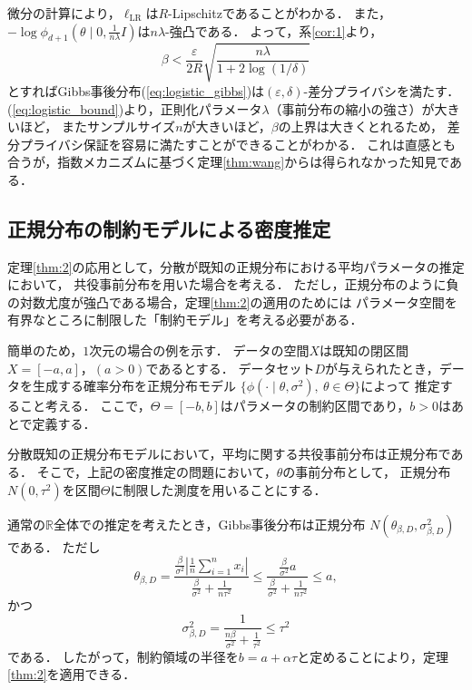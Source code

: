 \documentclass{jarticle}
\theoremstyle{definition}
\begin{document}
微分の計算により，$\ell_\mathrm{LR}$は$R$-Lipschitzであることがわかる．
また，$-\log \phi_{d+1}(\theta \mid 0, \frac{1}{n\lambda} I)$は$n\lambda$-強凸である．
よって，系\ref{cor:1}より，
\begin{equation}
\beta < \frac{\varepsilon}{2R}\sqrt{\frac{n\lambda}{1 + 2\log(1/\delta)}}
\label{eq:logistic_bound}
\end{equation}
とすればGibbs事後分布(\ref{eq:logistic_gibbs})は$(\varepsilon, \delta)$-差分プライバシを満たす．
(\ref{eq:logistic_bound})より，正則化パラメータ$\lambda$（事前分布の縮小の強さ）が大きいほど，
またサンプルサイズ$n$が大きいほど，$\beta$の上界は大きくとれるため，
差分プライバシ保証を容易に満たすことができることがわかる．
これは直感とも合うが，指数メカニズムに基づく定理\ref{thm:wang}からは得られなかった知見である．

\subsection{正規分布の制約モデルによる密度推定} \label{ssec:ex_normal}

定理\ref{thm:2}の応用として，分散が既知の正規分布における平均パラメータの推定において，
共役事前分布を用いた場合を考える．
ただし，正規分布のように負の対数尤度が強凸である場合，定理\ref{thm:2}の適用のためには
パラメータ空間を有界なところに制限した「制約モデル」を考える必要がある．

簡単のため，$1$次元の場合の例を示す．
データの空間$X$は既知の閉区間$X = [-a, a]$，$(a > 0)$であるとする．
データセット$D$が与えられたとき，データを生成する確率分布を正規分布モデル
$\{\phi(\cdot \mid \theta, \sigma^2), \: \theta \in \Theta \}$によって
推定すること考える．
ここで，$\Theta = [-b, b]$はパラメータの制約区間であり，$b>0$はあとで定義する．

分散既知の正規分布モデルにおいて，平均に関する共役事前分布は正規分布である．
そこで，上記の密度推定の問題において，$\theta$の事前分布として，
正規分布$N(0, \tau^2)$を区間$\Theta$に制限した測度を用いることにする．

通常の$\mathbb{R}$全体での推定を考えたとき，Gibbs事後分布は正規分布
$N(\theta_{\beta, D}, \sigma^2_{\beta, D})$である．
ただし
\begin{equation}
\theta_{\beta, D} = \frac{\frac{\beta}{\sigma^2} | \frac{1}{n} \sum_{i=1}^{n} x_i |}
{\frac{\beta}{\sigma^2} + \frac{1}{n\tau^2}}
\leq \frac{\frac{\beta}{\sigma^2} a}
{\frac{\beta}{\sigma^2} + \frac{1}{n\tau^2}} \leq a,
\end{equation}
かつ
\begin{equation}
\sigma^2_{\beta, D} = \frac{1}{\frac{n\beta}{\sigma^2} + \frac{1}{\tau^2}} \leq \tau^2
\end{equation}
である．
したがって，制約領域の半径を$b = a + \alpha \tau$と定めることにより，定理\ref{thm:2}を適用できる．
\end{document}
